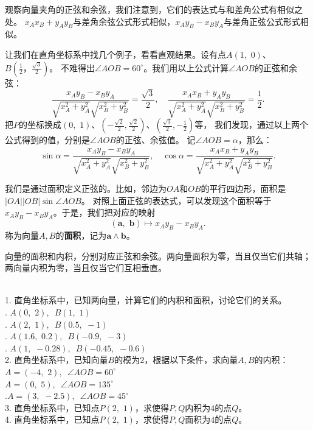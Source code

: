 \documentclass[12pt,UTF8]{ctexbook}
\begin{document}
观察向量夹角的正弦和余弦，我们注意到，它们的表达式与和差角公式有相似之处。
$x_Ax_B + y_Ay_B$与差角余弦公式形式相似，$x_Ay_B - x_By_A$与差角正弦公式形式相似。

让我们在直角坐标系中找几个例子，看看直观结果。设有点$A(1,\,\,0)$、$B(\frac{1}{2}，\frac{\sqrt{3}}{2})$。
不难得出$\angle AOB = 60^\circ$。我们用以上公式计算$\angle AOB$的正弦和余弦：
$$ \frac{x_Ay_B - x_By_A}{\sqrt{x_A^2 + y_A^2}\sqrt{x_B^2 + y_B^2}} = \frac{\sqrt{3}}{2}, \quad \frac{x_Ax_B + y_Ay_B}{\sqrt{x_A^2 + y_A^2} \sqrt{x_B^2 + y_B^2}} = \frac{1}{2}. $$
把$P$的坐标换成$(0,\,\,1)$、$(-\frac{\sqrt{2}}{2}, \frac{\sqrt{2}}{2})$、$(\frac{\sqrt{3}}{2},-\frac{1}{2})$等，
我们发现，通过以上两个公式得到的值，分别是$\angle AOB$的正弦、余弦值。
记$\angle AOB = \alpha$，那么：
$$ \sin \alpha = \frac{x_Ay_B - x_By_A}{\sqrt{x_A^2 + y_A^2}\sqrt{x_B^2 + y_B^2}}, \quad \cos \alpha = \frac{x_Ax_B + y_Ay_B}{\sqrt{x_A^2 + y_A^2} \sqrt{x_B^2 + y_B^2}}. $$

我们是通过面积定义正弦的。比如，邻边为$OA$和$OB$的平行四边形，面积是$|OA||OB|\sin \angle AOB$。
对照上面正弦的表达式，可以发现这个面积等于$x_Ay_B - x_By_A$。于是，我们把对应的映射
$$ (\mathbf{a}, \,\,\mathbf{b}) \mapsto x_Ay_B - x_By_A. $$
称为向量$A, B$的\textbf{面积}，记为$\mathbf{a} \wedge \mathbf{b}$。

向量的面积和内积，分别对应正弦和余弦。两向量面积为零，当且仅当它们共轴；两向量内积为零，当且仅当它们互相垂直。

\begin{xt}
    \mbox{} \\
    1. 直角坐标系中，已知两向量，计算它们的内积和面积，讨论它们的关系。\\
    . $A(0,\,\, 2), \,\,\, B(1, \,\,1)$ \\
    . $A(2,\,\, 1),\,\,\,  B(0.5, \,\,-1)$ \\
    . $A(1.6,\,\, 0.2), \,\,\, B(-0.9,\,\, -3)$\\
    . $A(1, \,\,-0.28), \,\,\, B(-0.45,\,\, -0.6)$\\
    2. 直角坐标系中，已知向量$B$的模为$2$，根据以下条件，求向量$A,B$的内积：\\
     $A = (-4, \,\,2), \,\,\, \angle AOB = 60^\circ$\\
     $A= (0,\,\, 5), \,\,\,\angle AOB = 135^\circ$\\
    .$A = (3,\,\, -2.5), \,\,\,\angle AOB = 45^\circ$\\
    3. 直角坐标系中，已知点$P(2,\,\,1)$，求使得$P,Q$内积为$4$的点$Q$。\\
    4. 直角坐标系中，已知点$P(2,\,\,1)$，求使得$P,Q$面积为$4$的点$Q$。
\end{xt}
\end{document}
